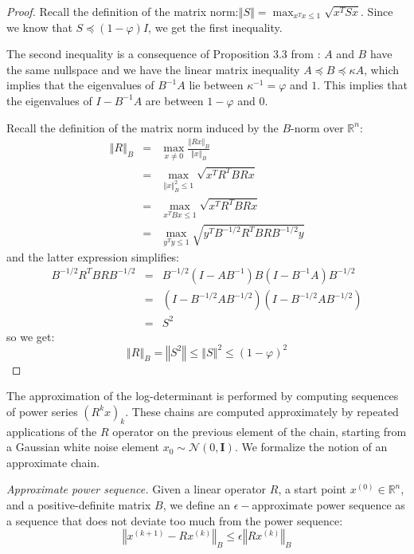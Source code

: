 \begin{proof} Recall the definition of the matrix norm:$\left\Vert S\right\Vert =\max_{x^{T}x\leq1}\sqrt{x^{T}Sx}$.
Since we know that $S\preceq\left(1-\varphi\right)I$, we get the
first inequality.

The second inequality is a consequence of Proposition 3.3 from \cite{Spielman2009a}:
$A$ and $B$ have the same nullspace and we have the linear matrix
inequality $A\preceq B\preceq\kappa A$, which implies that the eigenvalues
of $B^{-1}A$ lie between $\kappa^{-1}=\varphi$ and $1$. This implies
that the eigenvalues of $I-B^{-1}A$ are between $1-\varphi$ and
$0$.

Recall the definition of the matrix norm induced by the $B$-norm
over $\mathbb{R}^{n}$: 
\begin{eqnarray*}
\left\Vert R\right\Vert _{B} & = & \max_{x\neq0}\frac{\left\Vert Rx\right\Vert _{B}}{\left\Vert x\right\Vert _{B}}\\
 & = & \max_{\left\Vert x\right\Vert _{B}^{2}\leq1}\sqrt{x^{T}R^{T}BRx}\\
 & = & \max_{x^{T}Bx\leq1}\sqrt{x^{T}R^{T}BRx}\\
 & = & \max_{y^{T}y\leq1}\sqrt{y^{T}B^{-1/2}R^{T}BRB^{-1/2}y}
\end{eqnarray*}
and the latter expression simplifies: 
\begin{eqnarray*}
B^{-1/2}R^{T}BRB^{-1/2} & = & B^{-1/2}\left(I-AB^{-1}\right)B\left(I-B^{-1}A\right)B^{-1/2}\\
 & = & \left(I-B^{-1/2}AB^{-1/2}\right)\left(I-B^{-1/2}AB^{-1/2}\right)\\
 & = & S^{2}
\end{eqnarray*}
so we get: 
\[
\left\Vert R\right\Vert _{B}=\left\Vert S^{2}\right\Vert \leq\left\Vert S\right\Vert ^{2}\leq\left(1-\varphi\right)^{2}
\]


\end{proof} 

The approximation of the log-determinant is performed by computing
sequences of power series $\left(R^{k}x\right)_{k}$. These chains
are computed approximately by repeated applications of the $R$ operator
on the previous element of the chain, starting from a Gaussian white
noise element $x_{0}\sim\mathcal{N}\left(0,\mathbf{I}\right)$. We
formalize the notion of an approximate chain. 

\begin{definition} \emph{Approximate power sequence. }Given a linear
operator $R$, a start point $x^{\left(0\right)}\in\mathbb{R}^{n}$,
and a positive-definite matrix $B$, we define an $\epsilon-$approximate
power sequence as a sequence that does not deviate too much from the
power sequence: 
\[
\left\Vert x^{\left(k+1\right)}-Rx^{\left(k\right)}\right\Vert _{B}\leq\epsilon\left\Vert Rx^{\left(k\right)}\right\Vert _{B}
\]


\end{definition}

